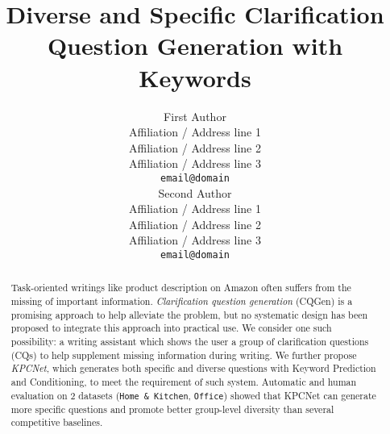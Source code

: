 \documentclass[11pt,a4paper]{article}
\title{Diverse and Specific Clarification Question Generation with Keywords}
\author{First Author \\
  Affiliation / Address line 1 \\
  Affiliation / Address line 2 \\
  Affiliation / Address line 3 \\
  \texttt{email@domain} \\\And
  Second Author \\
  Affiliation / Address line 1 \\
  Affiliation / Address line 2 \\
  Affiliation / Address line 3 \\
  \texttt{email@domain} \\}
\date{}
\newcommand{\KZ}[1]{\textcolor{blue}{Kenny: #1}}
\newcommand{\Zl}[1]{\textcolor{red}{Zhiling: #1}}
\begin{document}
\maketitle
\begin{abstract}
Task-oriented writings like product description on Amazon often suffers from the missing of important information. \textit{Clarification question generation} (CQGen) is a promising approach to help alleviate the problem, but no systematic design has been proposed to integrate this approach into practical use. We consider one such possibility: a writing assistant which shows the user a group of clarification questions (CQs) to help supplement missing information during writing. We further propose \textit{KPCNet}, which generates both specific and diverse questions with Keyword Prediction and Conditioning, to meet the requirement of such system. Automatic and human evaluation on 2 datasets (\texttt{Home \& Kitchen}, \texttt{Office}) showed that KPCNet can generate more specific questions and promote better group-level diversity than several competitive baselines.
\end{abstract}










\end{document}
